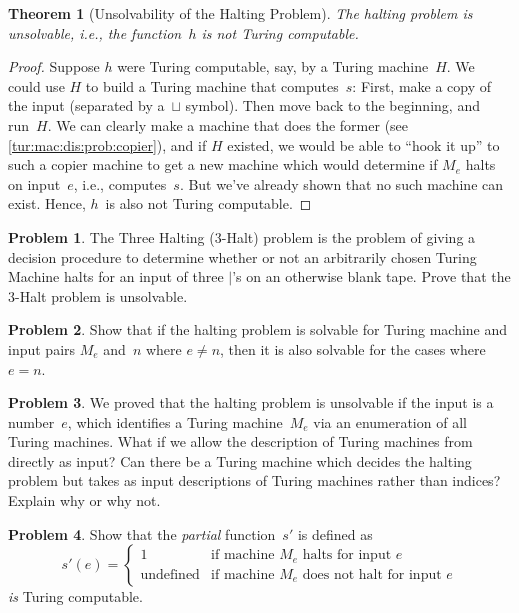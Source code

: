 \documentclass[10pt,a4paper]{article}
\makeatletter
\theoremstyle{plain}
\newtheorem{thm}{Theorem}[section]
\theoremstyle{definition}
\newtheorem{prob}{Problem}[section]
\theoremstyle{remark}
\newcommand*{\ollabel}[1]{\label{#1}}
\newcommand{\olref}{\@ifnextchar[{\olref@i}{\olref@final}}
\def\olref@i[#1]{\@ifnextchar[{\olref@ii}{\olref@final}}
\def\olref@ii[#1]{\@ifnextchar[{\olref@iii}{\olref@final}}
\def\olref@iii[#1]{\olref@final}
\def\olref@final#1{\ref{#1}}
\providecommand{\TMblank}{\sqcup}
\providecommand{\TMstroke}{\mid}
\providecommand{\cref}[1]{\ref{#1}}
\makeatother
\begin{document}
\begin{thm}[Unsolvability of the Halting Problem]
\ollabel{thm:halting-problem} The halting problem is unsolvable, i.e.,
the function~$h$ is not Turing computable.
\end{thm}

\begin{proof}
Suppose $h$ were Turing computable, say, by a Turing machine~$H$. We
could use $H$ to build a Turing machine that computes~$s$: First, make
a copy of the input (separated by a~$\TMblank$ symbol). Then move back
to the beginning, and run~$H$.  We can clearly make a machine that
does the former (see \cref{tur:mac:dis:prob:copier}), and if $H$
existed, we would be able to ``hook it up'' to such a copier machine
to get a new machine which would determine if $M_e$ halts on
input~$e$, i.e., computes~$s$. But we've already shown that no such
machine can exist. Hence, $h$~is also not Turing computable.
\end{proof}

\begin{prob}
The Three Halting (3-Halt) problem is the problem of giving a decision
procedure to determine whether or not an arbitrarily chosen Turing
Machine halts for an input of three $\TMstroke$'s on an otherwise
blank tape. Prove that the 3-Halt problem is unsolvable.
\end{prob}

\begin{prob}
Show that if the halting problem is solvable for Turing machine and
input pairs $M_e$ and~$n$ where $e \neq n$, then it is also solvable
for the cases where $e = n$.
\end{prob}

\begin{prob}
We proved that the halting problem is unsolvable if the input is a
number~$e$, which identifies a Turing machine~$M_e$ via an enumeration
of all Turing machines.  What if we allow the description of Turing
machines from \olref[tur][und][enu]{sec} directly as input?  Can there
be a Turing machine which decides the halting problem but takes as
input descriptions of Turing machines rather than indices?  Explain
why or why not.
\end{prob}

\begin{prob} Show that the \emph{partial} function~$s'$ is defined as
  \[
  s'(e) =
  \begin{cases}
    \text{1} & \text{if machine~$M_e$ halts for input $e$}\\
    \text{undefined} & \text{if machine~$M_e$ does not halt for input $e$}
  \end{cases}
  \]
  \emph{is} Turing computable.
\end{prob}
\end{document}
